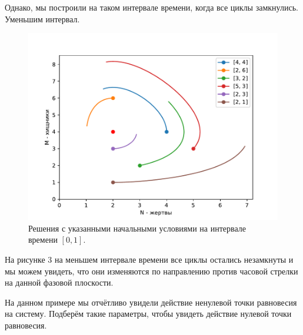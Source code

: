         Однако, мы построили на таком интервале времени, когда все циклы замкнулись. Уменьшим интервал. 


        \begin{figure}[H]
            \centering
            \includegraphics[width=12cm]{pictures/population4.pdf}
            \caption{Решения с указанными начальными условиями на интервале времени $ [0, 1] $.}
        \end{figure}
        На рисунке 3 на меньшем интервале времени все циклы остались незамкнуты и мы можем увидеть, что они изменяются по направлению против часовой стрелки на данной фазовой плоскости.

        На данном примере мы отчётливо увидели действие ненулевой точки равновесия на систему. Подберём такие параметры, чтобы увидеть действие нулевой точки равновесия.


